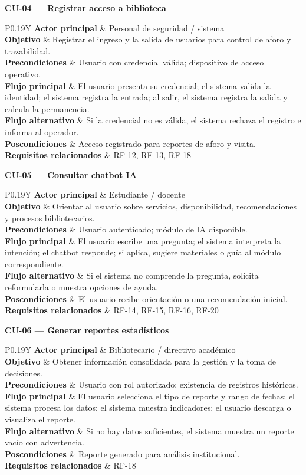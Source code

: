 \documentclass[12pt,journal,onecolumn]{IEEEtran}
\newcommand{\caseblock}[9]{%
\medskip\noindent\textbf{#1 --- #2}\par\smallskip
\begin{tabularx}{\textwidth}{P{0.19\textwidth}Y}\toprule
\textbf{Actor principal} & #3\\
\textbf{Objetivo} & #4\\
\textbf{Precondiciones} & #5\\
\textbf{Flujo principal} & #6\\
\textbf{Flujo alternativo} & #7\\
\textbf{Poscondiciones} & #8\\
\textbf{Requisitos relacionados} & #9\\\bottomrule
\end{tabularx}\par\medskip}
\begin{document}
\caseblock{CU-04}{Registrar acceso a biblioteca}{Personal de seguridad / sistema}{Registrar el ingreso y la salida de usuarios para control de aforo y trazabilidad.}{Usuario con credencial válida; dispositivo de acceso operativo.}{El usuario presenta su credencial; el sistema valida la identidad; el sistema registra la entrada; al salir, el sistema registra la salida y calcula la permanencia.}{Si la credencial no es válida, el sistema rechaza el registro e informa al operador.}{Acceso registrado para reportes de aforo y visita.}{RF-12, RF-13, RF-18}
\caseblock{CU-05}{Consultar chatbot IA}{Estudiante / docente}{Orientar al usuario sobre servicios, disponibilidad, recomendaciones y procesos bibliotecarios.}{Usuario autenticado; módulo de IA disponible.}{El usuario escribe una pregunta; el sistema interpreta la intención; el chatbot responde; si aplica, sugiere materiales o guía al módulo correspondiente.}{Si el sistema no comprende la pregunta, solicita reformularla o muestra opciones de ayuda.}{El usuario recibe orientación o una recomendación inicial.}{RF-14, RF-15, RF-16, RF-20}
\caseblock{CU-06}{Generar reportes estadísticos}{Bibliotecario / directivo académico}{Obtener información consolidada para la gestión y la toma de decisiones.}{Usuario con rol autorizado; existencia de registros históricos.}{El usuario selecciona el tipo de reporte y rango de fechas; el sistema procesa los datos; el sistema muestra indicadores; el usuario descarga o visualiza el reporte.}{Si no hay datos suficientes, el sistema muestra un reporte vacío con advertencia.}{Reporte generado para análisis institucional.}{RF-18}
\end{document}
